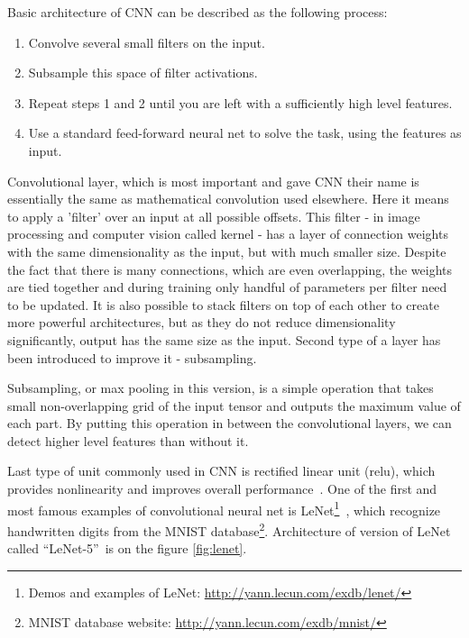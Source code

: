 Basic architecture of CNN can be described as the following process:

\vspace{8mm}
\begin{minipage}{0.9\textwidth}
\begin{enumerate}
	\item Convolve several small filters on the input.
	\item Subsample this space of filter activations.
	\item Repeat steps 1 and 2 until you are left with a sufficiently high level features.
	\item Use a standard feed-forward neural net to solve the task, using the features as input.
\end{enumerate}
\end{minipage}
\vspace{1cm}

Convolutional layer, which is most important and gave CNN their name is essentially the same as mathematical convolution used elsewhere. Here it means to apply a 'filter' over an input at all possible offsets. This filter - in image processing and computer vision called kernel - has a layer of connection weights with the same dimensionality as the input, but with much smaller size. Despite the fact that there is many connections, which are even overlapping, the weights are tied together and during training only handful of parameters per filter need to be updated. It is also possible to stack filters on top of each other to create more powerful architectures, but as they do not reduce dimensionality significantly, output has the same size as the input. Second type of a layer has been introduced to improve it - subsampling.

Subsampling, or max pooling in this version, is a simple operation that takes small non-overlapping grid of the input tensor and outputs the maximum value of each part. By putting this operation in between the convolutional layers, we can detect higher level features than without it.

Last type of unit commonly used in CNN is rectified linear unit (\gls{relu}), which provides nonlinearity and improves overall performance~\cite{jarrett-iccv-09, DBLP:conf/icml/NairH10}. One of the first and most famous examples of convolutional neural net is LeNet\footnote{Demos and examples of LeNet: \url{http://yann.lecun.com/exdb/lenet/}}~\cite{lecun-98}, which recognize handwritten digits from the MNIST database\footnote{MNIST database website: \url{http://yann.lecun.com/exdb/mnist/}}. Architecture of version of LeNet called \textquotedblleft LeNet-5\textquotedblright\ is on the figure \ref{fig:lenet}.

